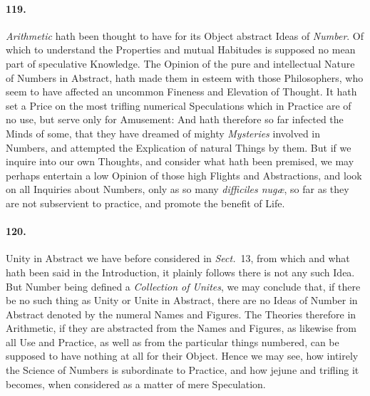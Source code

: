 \documentclass[]{article}
\newenvironment{sectionbody}{}{}
\begin{document}
\begin{sectionbody}
\paragraph{119.} \emph{Arithmetic} hath been thought to have for its Object
abstract Ideas of \emph{Number}.  Of which to understand the
Properties and mutual Habitudes is supposed no mean part of
speculative Knowledge.  The Opinion of the pure and intellectual
Nature of Numbers in Abstract, hath made them in esteem with
those Philosophers, who seem to have affected an uncommon
Fineness and Elevation of Thought.  It hath set a Price on the
most trifling numerical Speculations which in Practice are of no
use, but serve only for Amusement: And hath therefore so far
infected the Minds of some, that they have dreamed of mighty
\emph{Mysteries} involved in Numbers, and attempted the
Explication of natural Things by them.  But if we inquire into
our own Thoughts, and consider what hath been premised, we may
perhaps entertain a low Opinion of those high Flights and
Abstractions, and look on all Inquiries about Numbers, only as so
many \emph{difficiles nug{\ae}}, so far as they are not
subservient to practice, and promote the benefit of Life.



\paragraph{120.} Unity in Abstract we have before considered in
\emph{Sect.}~13,
from which and what hath been said in the Introduction, it
plainly follows there is not any such Idea.  But Number being
defined a \emph{Collection of Unites}, we may conclude that, if
there be no such thing as Unity or Unite in Abstract, there are
no Ideas of Number in Abstract denoted by the numeral Names and
Figures.  The Theories therefore in Arithmetic, if they are
abstracted from the Names and Figures, as likewise from all Use
and Practice, as well as from the particular things numbered, can
be supposed to have nothing at all for their Object.  Hence we
may see, how intirely the Science of Numbers is subordinate to
Practice, and how jejune and trifling it becomes, when considered
as a matter of mere Speculation.




\end{sectionbody}
\end{document}
